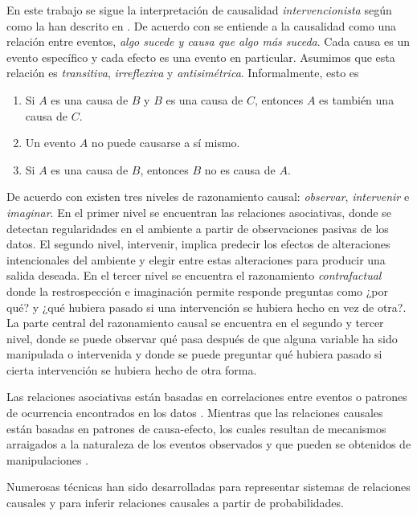 En este trabajo se sigue la interpretación de causalidad  
\textit{intervencionista} según como la han descrito en \cite{woodward2005making, spirtes2000causation, pearl_2009}.
De acuerdo con \cite{spirtes2000causation} se entiende a la causalidad 
como una relación entre eventos, \textit{algo sucede y causa que algo más suceda}. Cada causa es un evento específico y cada efecto es una evento
en particular. Asumimos que esta relación es \textit{transitiva}, \textit{irreflexiva} y \textit{antisimétrica}. Informalmente, esto es 
\begin{enumerate}
    \item Si $A$ es una causa de $B$ y $B$ es una causa de $C$, entonces
    $A$ es también una causa de $C$.
    \item Un evento $A$ no puede causarse a sí mismo.
    \item Si $A$ es una causa de $B$, entonces $B$ no es causa de $A$.
\end{enumerate}


De acuerdo con \cite{pearl2018bookofwhy} existen tres niveles
de razonamiento causal: \textit{observar}, \textit{intervenir}
e \textit{imaginar}.
En el primer nivel se encuentran las 
relaciones asociativas, donde se detectan regularidades
en el ambiente a partir de observaciones pasivas de los datos.
El segundo nivel, intervenir, implica predecir los 
efectos de alteraciones intencionales del ambiente
y elegir entre estas alteraciones  para producir una
salida deseada. En el tercer nivel se encuentra
el razonamiento \textit{contrafactual} donde la restrospección
e imaginación permite responde preguntas como ¿por qué?
y ¿qué hubiera pasado si una intervención se hubiera hecho 
en vez de otra?.
La parte central del razonamiento causal se encuentra en el segundo
y tercer nivel, donde se puede observar qué pasa después de que 
alguna variable ha sido manipulada o intervenida y donde se puede
preguntar qué hubiera pasado si cierta intervención se hubiera 
hecho de otra forma.

Las relaciones asociativas están basadas en correlaciones
entre eventos o patrones de ocurrencia encontrados en los
datos \cite{pearl2018bookofwhy}. Mientras que las relaciones
causales están basadas en patrones de causa-efecto,
los cuales resultan de mecanismos arraigados a la naturaleza
de los eventos observados y que pueden se obtenidos de 
manipulaciones \cite{sep-causal-models}.

Numerosas técnicas han sido desarrolladas para representar
sistemas de relaciones causales y para inferir 
relaciones causales a partir de probabilidades. 

